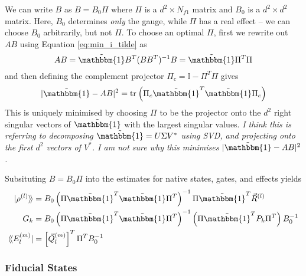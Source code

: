 We can write $B$ as $B = B_0 \Pi$ where $\Pi$ is a $d^2 \times N_{f1}$ matrix and $B_0$ is a $d^2
\times d^2$ matrix. Here, $B_0$ determines \textit{only} the gauge, while $\Pi$ has a real effect --
we can choose $B_0$ arbitrarily, but not $\Pi$. To choose an optimal $\Pi$, first we rewrite out
$AB$ using Equation \ref{eq:min_i_tilde} as
\begin{equation}
    AB = \tilde{\mathbbm{1}} B^T (B B^T)^{-1} B = \tilde{\mathbbm{1}} \Pi^T \Pi
\end{equation}
and then defining the complement projector $\Pi_c = \mathbb{I} - \Pi^T \Pi$ gives
\begin{equation}
    |\tilde{\mathbbm{1}} - AB|^2 = \tr{\Pi_c \tilde{\mathbbm{1}}^T \tilde{\mathbbm{1}} \Pi_c}
\end{equation}
This is uniquely minimised by choosing $\Pi$ to be the projector onto the $d^2$ right singular
vectors of $\tilde{\mathbbm{1}}$ with the largest singular values. \textit{I think this is referring
to decomposing $\tilde{\mathbbm{1}} = U \Sigma V^*$ using SVD, and projecting onto the first $d^2$
vectors of $V^*$. I am not sure why this minimises $|\tilde{\mathbbm{1}} - AB|^2$.}

Subsituting $B = B_0 \Pi$ into the estimates for native states, gates, and effects yields
\begin{align}
    \superket{\rho^{(l)}} &= B_0 \left(\Pi \tilde{\mathbbm{1}}^T \tilde{\mathbbm{1}} \Pi^T \right)^{-1} \Pi \tilde{\mathbbm{1}}^T \vec{R}^{(l)} \\
    G_k                   &= B_0 \left(\Pi \tilde{\mathbbm{1}}^T \tilde{\mathbbm{1}} \Pi^T \right)^{-1} \left(\Pi \tilde{\mathbbm{1}}^T P_k \Pi^T \right) B_0^{-1} \\
    \superbra{E_l^{(m)}}  &= \left[\vec{Q}_l^{(m)}\right]^T \Pi^T B_0^{-1}
\end{align}

\subsubsection{Fiducial States}


